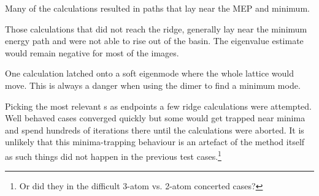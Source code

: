 Many of the calculations resulted in paths that lay near the MEP and minimum.


Those calculations that did not reach the ridge, generally lay near the minimum energy path and were not able to rise out of the basin.
The eigenvalue estimate would remain negative for most of the images.

One calculation latched onto a soft eigenmode where the whole lattice would move.
This is always a danger when using the dimer to find a minimum mode.

Picking the most relevant s as endpoints a few ridge calculations were attempted.
Well behaved cases converged quickly but some would get trapped near minima and spend hundreds of iterations there until the calculations were aborted.
It is unlikely that this minima-trapping behaviour is an artefact of the method itself as such things did not happen in the previous test cases.\footnote{Or did they in the difficult 3-atom vs. 2-atom concerted cases?}



